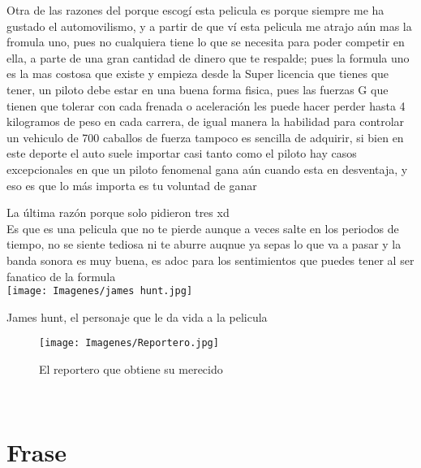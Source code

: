 \documentclass[ä5paper, 11pt]{article}
\begin{document}
\textcolor{naranja}{Otra de las razones del porque escogí esta pelicula es porque siempre me ha gustado el automovilismo, y a partir de que ví esta pelicula me atrajo aún mas la fromula uno, pues no cualquiera tiene lo que se necesita para poder competir en ella, a parte de una gran cantidad de dinero que te respalde; pues la formula uno es la mas costosa que existe y empieza desde la Super licencia que tienes que tener, un piloto debe estar en una buena forma fisica, pues las fuerzas G que tienen que tolerar con cada frenada o aceleración les puede hacer perder hasta 4 kilogramos de peso en cada carrera, de igual manera la habilidad para controlar un vehiculo de 700 caballos de fuerza tampoco es sencilla de adquirir, si bien en este deporte el auto suele importar casi tanto como el piloto hay casos excepcionales en que un piloto fenomenal gana aún cuando esta en desventaja, y eso es que lo más importa es tu voluntad de ganar}

\textcolor{verde}{La última razón porque solo pidieron tres xd\\ Es que es una pelicula que no te pierde aunque a veces salte en los periodos de tiempo, no se siente tediosa ni te aburre auqnue ya sepas lo que va a pasar y la banda sonora es muy buena, es adoc para los sentimientos que puedes tener al ser fanatico de la formula}\\
\texttt{[image: Imagenes/james hunt.jpg]}{\caption{James hunt, el personaje que le da vida a la pelicula}}

\begin{wrapfigure}
\texttt{[image: Imagenes/Reportero.jpg]} {\caption{El reportero que obtiene su merecido}}
\end{wrapfigure}
\\
\section*{Frase}
\textbf{\large{}}\\
\textbf{\large{}}
\end{document}
